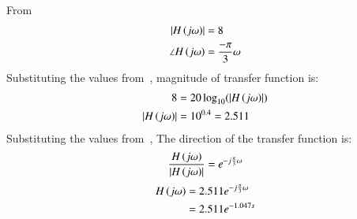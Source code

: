 \documentclass[journal,12pt,twocolumn]{IEEEtran}
\theoremstyle{remark}
\begin{document}
    \solution
    From~
    \begin{align}
        \left\vert{H}\left(j\omega\right)\right\vert&= 8 \\
        \angle H\left(j\omega\right) &= \frac{-\pi}{3} \omega
    \end{align}
    Substituting the values from~, magnitude of transfer function is:
    \begin{align}
        8 &= 20\log_{10}(\left\vert{H}\left(j\omega\right)\right\vert)\\
        \left\vert{H}\left(j\omega\right)\right\vert &= 10^{0.4} = 2.511
    \end{align}
    Substituting the values from~, The direction of the transfer function is:
    \begin{align}
        \frac{H\left(j\omega\right)}{\left\vert{H}\left(j\omega\right)\right\vert} = e^{-j\frac{\pi}{3}\omega}
    \end{align}
    \begin{align}
        H\left(j\omega\right) &= 2.511 e^{-j\frac{\pi}{3}\omega} \\
        &= 2.511 e^{-1.047s}
    \end{align}
    \setcounter{figure}{1} %
\end{document}
